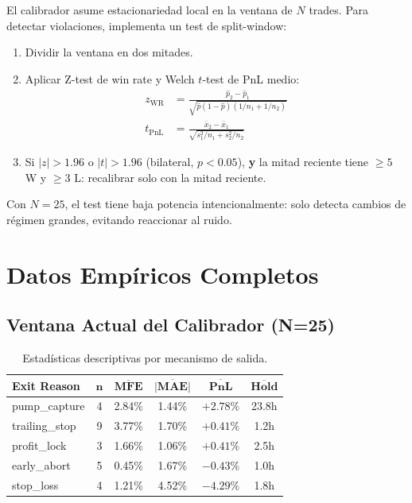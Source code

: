 \documentclass[11pt,a4paper]{article}
\begin{document}
El calibrador asume estacionariedad local en la ventana de $N$ trades.
Para detectar violaciones, implementa un test de split-window:

\begin{enumerate}[leftmargin=2em]
\item Dividir la ventana en dos mitades.
\item Aplicar Z-test de win rate y Welch $t$-test de PnL medio:
  \begin{align}
  z_{\text{WR}} &= \frac{\hat{p}_2 - \hat{p}_1}
    {\sqrt{\hat{p}(1-\hat{p})(1/n_1 + 1/n_2)}} \\
  t_{\text{PnL}} &= \frac{\bar{x}_2 - \bar{x}_1}
    {\sqrt{s_1^2/n_1 + s_2^2/n_2}}
  \end{align}
\item Si $|z| > 1.96$ o $|t| > 1.96$ (bilateral, $p < 0.05$),
  \textbf{y} la mitad reciente tiene $\geq 5$ W y $\geq 3$ L:
  recalibrar solo con la mitad reciente.
\end{enumerate}

Con $N=25$, el test tiene baja potencia intencionalmente: solo detecta
cambios de r\'egimen grandes, evitando reaccionar al ruido.


\section{Datos Emp\'iricos Completos}
\label{sec:data}

\subsection{Ventana Actual del Calibrador (N=25)}

\begin{table}[H]
\centering
\caption{Estad\'isticas descriptivas por mecanismo de salida.}
\label{tab:exit_stats}
\begin{tabular}{lccccc}
\toprule
\textbf{Exit Reason} & $\bm{n}$ & $\overline{\textbf{MFE}}$ &
  $\overline{|\textbf{MAE}|}$ & $\overline{\textbf{PnL}}$ &
  $\overline{\textbf{Hold}}$ \\
\midrule
pump\_capture & 4 & 2.84\% & 1.44\% & $+2.78\%$ & 23.8h \\
trailing\_stop & 9 & 3.77\% & 1.70\% & $+0.41\%$ & 1.2h \\
profit\_lock & 3 & 1.66\% & 1.06\% & $+0.41\%$ & 2.5h \\
early\_abort & 5 & 0.45\% & 1.67\% & $-0.43\%$ & 1.0h \\
stop\_loss & 4 & 1.21\% & 4.52\% & $-4.29\%$ & 1.8h \\
\bottomrule
\end{tabular}
\end{table}
\end{document}

